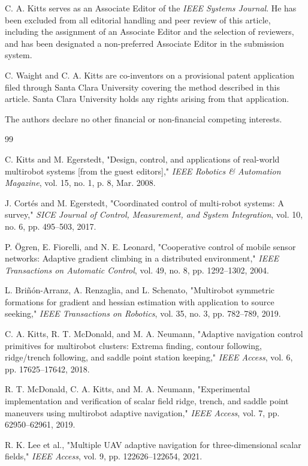 \documentclass[lettersize,journal]{IEEEtran}
\begin{document}
C. A. Kitts serves as an Associate Editor of the \textit{IEEE Systems Journal}. He has been excluded from all editorial handling and peer review of this article, including the assignment of an Associate Editor and the selection of reviewers, and has been designated a non-preferred Associate Editor in the submission system.

C. Waight and C. A. Kitts are co-inventors on a provisional patent application filed through Santa Clara University covering the method described in this article. Santa Clara University holds any rights arising from that application.

The authors declare no other financial or non-financial competing interests.


\begin{thebibliography}{99}

 C. Kitts and M. Egerstedt, "Design, control, and applications of real-world multirobot systems [from the guest editors]," \textit{IEEE Robotics \& Automation Magazine}, vol. 15, no. 1, p. 8, Mar. 2008.

 J. Cortés and M. Egerstedt, "Coordinated control of multi-robot systems: A survey," \textit{SICE Journal of Control, Measurement, and System Integration}, vol. 10, no. 6, pp. 495--503, 2017.

 P. Ögren, E. Fiorelli, and N. E. Leonard, "Cooperative control of mobile sensor networks: Adaptive gradient climbing in a distributed environment," \textit{IEEE Transactions on Automatic Control}, vol. 49, no. 8, pp. 1292--1302, 2004.

 L. Briñón-Arranz, A. Renzaglia, and L. Schenato, "Multirobot symmetric formations for gradient and hessian estimation with application to source seeking," \textit{IEEE Transactions on Robotics}, vol. 35, no. 3, pp. 782--789, 2019.

 C. A. Kitts, R. T. McDonald, and M. A. Neumann, "Adaptive navigation control primitives for multirobot clusters: Extrema finding, contour following, ridge/trench following, and saddle point station keeping," \textit{IEEE Access}, vol. 6, pp. 17625--17642, 2018.

 R. T. McDonald, C. A. Kitts, and M. A. Neumann, "Experimental implementation and verification of scalar field ridge, trench, and saddle point maneuvers using multirobot adaptive navigation," \textit{IEEE Access}, vol. 7, pp. 62950--62961, 2019.

 R. K. Lee et al., "Multiple UAV adaptive navigation for three-dimensional scalar fields," \textit{IEEE Access}, vol. 9, pp. 122626--122654, 2021.


\end{thebibliography}
\end{document}
